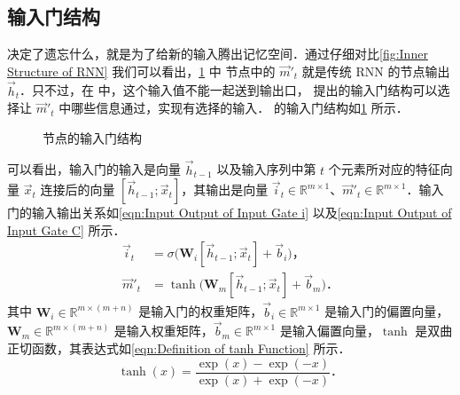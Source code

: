 \subsection{\lstm{} 输入门结构}
决定了遗忘什么，就是为了给新的输入腾出记忆空间．通过仔细对比\cref{fig:Inner Structure of RNN} 我们可以看出，\cref{fig:Input Gate of LSTM} 中 \lstm{} 节点中的 $\vec{m}'_t$ 就是传统 RNN 的节点输出 $\vec{h}_t$．只不过，在 \lstm{} 中，这个输入值不能一起送到输出口，\lstm{} 提出的输入门结构可以选择让 $\vec{m}'_t$ 中哪些信息通过，实现有选择的输入．\lstm{} 的输入门结构如\cref{fig:Input Gate of LSTM} 所示．%
%
\begin{figure}[!htb]
  \centering
  \scalebox{0.7}{}
  \caption{\lstm{} 节点的输入门结构}
  \label{fig:Input Gate of LSTM}
\end{figure}%
%
可以看出，输入门的输入是向量 $\vec{h}_{t-1}$ 以及输入序列中第 $t$ 个元素所对应的特征向量 $\vec{x}_t$ 连接后的向量 $[\vec{h}_{t-1};\vec{x}_t]$，其输出是向量 $\vec{i}_t\in\mathbb{R}^{m\times 1}$、$\vec{m}'_t\in\mathbb{R}^{m\times 1}$．输入门的输入输出关系如\cref{eqn:Input Output of Input Gate i} 以及\cref{eqn:Input Output of Input Gate C} 所示．%
%
\begin{align}
  \label{eqn:Input Output of Input Gate i}
  \vec{i}_t  &= \sigma\big(\bm{W}_i[\vec{h}_{t-1};\vec{x}_t] + \vec{b}_i\big)\text{，}\\
  \label{eqn:Input Output of Input Gate C}
  \vec{m}'_t &= \tanh\big(\bm{W}_m[\vec{h}_{t-1};\vec{x}_t] + \vec{b}_m\big)\text{．}
\end{align}%
%
其中 $\bm{W}_i\in\mathbb{R}^{m\times (m+n)}$ 是输入门的权重矩阵，$\vec{b}_i\in\mathbb{R}^{m\times 1}$ 是输入门的偏置向量，$\bm{W}_m\in\mathbb{R}^{m\times (m+n)}$ 是输入权重矩阵，$\vec{b}_m\in\mathbb{R}^{m\times 1}$ 是输入偏置向量，$\tanh$ 是双曲正切函数，其表达式如\cref{eqn:Definition of tanh Function} 所示．%
%
\begin{equation}\label{eqn:Definition of tanh Function}
  \tanh(x) = \frac{\exp(x) - \exp(-x)}{\exp(x) + \exp(-x)}\text{．}
\end{equation}


